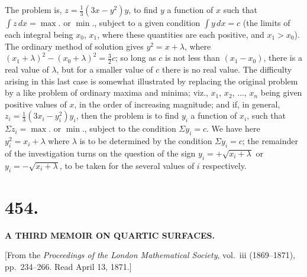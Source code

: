 \documentclass[11pt,a4paper]{article}
\begin{document}
The problem is, $z = \frac{1}{3}(3x - y^2)y$, to find $y$ a function of $x$ such that $\int z\,dx = \max.$ or $\min.$, subject to a given condition $\int y\,dx = c$ (the limits of each integral being $x_0$, $x_1$, where these quantities are each positive, and $x_1 > x_0$). The ordinary method of solution gives $y^2 = x + \lambda$, where $(x_1 + \lambda)^2 - (x_0 + \lambda)^2 = \frac{3}{2}c$; so long as $c$ is not less than $(x_1 - x_0)$, there is a real value of $\lambda$, but for a smaller value of $c$ there is no real value. The difficulty arising in this last case is somewhat illustrated by replacing the original problem by a like problem of ordinary maxima and minima; viz., $x_1$, $x_2$, $\ldots$, $x_n$ being given positive values of $x$, in the order of increasing magnitude; and if, in general, $z_i = \frac{1}{3}(3x_i - y_i^2)y_i$, then the problem is to find $y_i$ a function of $x_i$, such that $\Sigma z_i = \max.$ or $\min.$, subject to the condition $\Sigma y_i = c$. We have here $y_i^2 = x_i + \lambda$ where $\lambda$ is to be determined by the condition $\Sigma y_i = c$; the remainder of the investigation turns on the question of the sign $y_i = +\sqrt{x_i + \lambda}$ or $y_i = -\sqrt{x_i + \lambda}$, to be taken for the several values of $i$ respectively.

\clearpage

\section*{\textbf{454.}}

\begin{center}
\textbf{A THIRD MEMOIR ON QUARTIC SURFACES.}
\end{center}

[From the \textit{Proceedings of the London Mathematical Society}, vol.~iii (1869--1871), pp.~234--266. Read April 13, 1871.]
\end{document}
